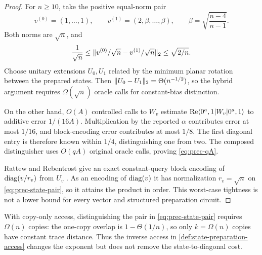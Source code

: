 \begin{proof}
For $n\geq10$, take the positive equal-norm pair
\begin{equation}
 v^{(0)}=(1,\ldots,1),\qquad
 v^{(1)}=(2,\beta,\ldots,\beta),\qquad
 \beta=\sqrt{\frac{n-4}{n-1}}.                           \label{eq:prec-state-pair}
\end{equation}
Both norms are $\sqrt n$, and
\begin{equation}
 \frac1{\sqrt n}\leq
 \lVert v^{(0)}/\sqrt n-v^{(1)}/\sqrt n\rVert_2
 \leq\sqrt{2/n}.                                        \label{eq:prec-close-states}
\end{equation}
Choose unitary extensions $U_0,U_1$ related by the minimum planar rotation
between the prepared states.  Then
$\lVert U_0-U_1\rVert_2=\Theta(n^{-1/2})$, so the hybrid argument requires
$\Omega(\sqrt n)$ oracle calls for constant-bias distinction.

On the other hand, $O(A)$ controlled calls to $W_v$ estimate
$\operatorname{Re}\langle 0^a,1\rvert W_v\lvert 0^a,1\rangle$ to additive error $1/(16A)$.
Multiplication by the reported $\alpha$ contributes error at most $1/16$,
and block-encoding error contributes at most $1/8$.  The first diagonal entry
is therefore known within $1/4$, distinguishing one from two.  The composed
distinguisher uses $O(qA)$ original oracle calls, proving
\eqref{eq:prec-qA}.

Rattew and Rebentrost give an exact constant-query block encoding of
$\operatorname{diag}(v/r_v)$ from $U_v$ \cite{rattew2023-non-linear-transformations-of-quantum}.
As an encoding of $\operatorname{diag}(v)$ it has normalization $r_v=\sqrt n$ on
\eqref{eq:prec-state-pair}, so it attains the product in order.  This
worst-case tightness is not a lower bound for every vector and structured
preparation circuit.
\end{proof}

With copy-only access, distinguishing the pair in
\eqref{eq:prec-state-pair} requires $\Omega(n)$ copies: the one-copy overlap
is $1-\Theta(1/n)$, so only $k=\Omega(n)$ copies have constant trace
distance.  Thus the inverse access in \cref{def:state-preparation-access}
changes the exponent but does not remove the state-to-diagonal cost.

